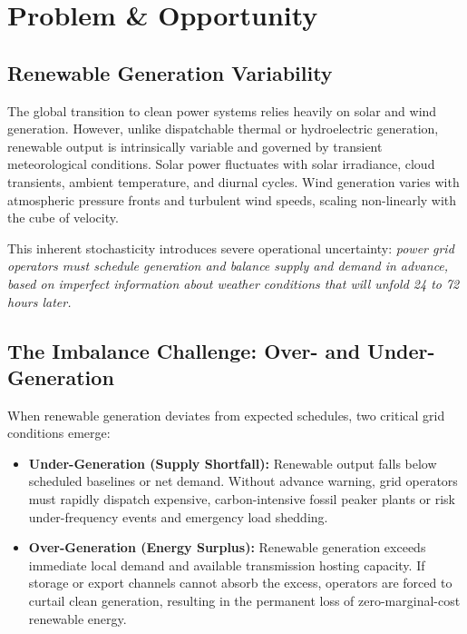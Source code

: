 \section{Problem \& Opportunity}
\label{sec:problem_opportunity}

\subsection{Renewable Generation Variability}
\label{subsec:variability}

The global transition to clean power systems relies heavily on solar and wind generation. However, unlike dispatchable thermal or hydroelectric generation, renewable output is intrinsically variable and governed by transient meteorological conditions. Solar power fluctuates with solar irradiance, cloud transients, ambient temperature, and diurnal cycles. Wind generation varies with atmospheric pressure fronts and turbulent wind speeds, scaling non-linearly with the cube of velocity.

This inherent stochasticity introduces severe operational uncertainty: \emph{power grid operators must schedule generation and balance supply and demand in advance, based on imperfect information about weather conditions that will unfold 24 to 72 hours later.}

\subsection{The Imbalance Challenge: Over- and Under-Generation}
\label{subsec:imbalance_challenge}

When renewable generation deviates from expected schedules, two critical grid conditions emerge:
\begin{itemize}[leftmargin=1.5em, itemsep=0.2em]
    \item \textbf{Under-Generation (Supply Shortfall):} Renewable output falls below scheduled baselines or net demand. Without advance warning, grid operators must rapidly dispatch expensive, carbon-intensive fossil peaker plants or risk under-frequency events and emergency load shedding.
    \item \textbf{Over-Generation (Energy Surplus):} Renewable generation exceeds immediate local demand and available transmission hosting capacity. If storage or export channels cannot absorb the excess, operators are forced to curtail clean generation, resulting in the permanent loss of zero-marginal-cost renewable energy.
\end{itemize}

